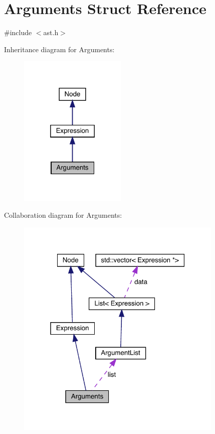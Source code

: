 \hypertarget{struct_arguments}{}\section{Arguments Struct Reference}
\label{struct_arguments}


{\ttfamily \#include $<$ast.\+h$>$}



Inheritance diagram for Arguments\+:\nopagebreak
\begin{figure}[H]
\begin{center}
\leavevmode
\includegraphics[width=145pt]{struct_arguments__inherit__graph}
\end{center}
\end{figure}


Collaboration diagram for Arguments\+:\nopagebreak
\begin{figure}[H]
\begin{center}
\leavevmode
\includegraphics[width=280pt]{struct_arguments__coll__graph}
\end{center}
\end{figure}
